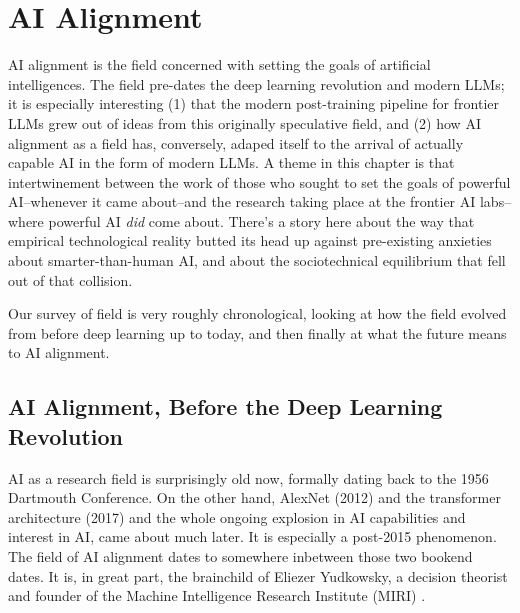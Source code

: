 \chapter{AI Alignment}\label{ch_ai_alignment}

AI alignment is the field concerned with setting the goals of artificial
intelligences. The field pre-dates the deep learning revolution and modern
LLMs; it is especially interesting (1) that the modern post-training pipeline
for frontier LLMs grew out of ideas from this originally speculative field, and
(2) how AI alignment as a field has, conversely, adaped itself to the arrival
of actually capable AI in the form of modern LLMs. A theme in this chapter is
that intertwinement between the work of those who sought to set the goals of
powerful AI--whenever it came about--and the research taking place at the
frontier AI labs--where powerful AI \emph{did} come about. There's a story here
about the way that empirical technological reality butted its head up against
pre-existing anxieties about smarter-than-human AI, and about the
sociotechnical equilibrium that fell out of that collision.

Our survey of field is very roughly chronological, looking at how the field
evolved from before deep learning up to today, and then finally at what the
future means to AI alignment.

\section{AI Alignment, Before the Deep Learning Revolution}
AI as a research field is surprisingly old now, formally dating back to the
1956 Dartmouth Conference. On the other hand, AlexNet (2012)
\cite{krizhevsky2012imagenet} and the transformer architecture (2017)
\cite{vaswani2017attention} and the whole ongoing explosion in AI capabilities
and interest in AI, came about much later. It is especially a post-2015
phenomenon. The field of AI alignment dates to somewhere inbetween those two
bookend dates. It is, in great part, the brainchild of Eliezer Yudkowsky, a
decision theorist and founder of the Machine Intelligence Research Institute
(MIRI) \cite{yudkowsky2008factor}.


